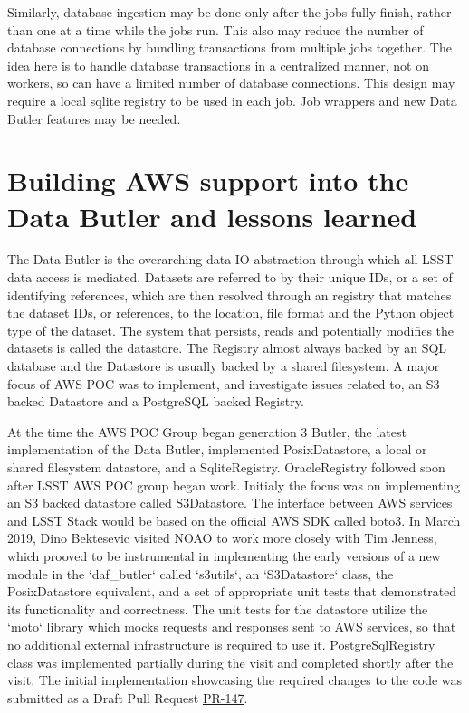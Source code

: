 Similarly, database ingestion may be done only after the jobs fully finish, rather than one at a time while the jobs run.
This also may reduce the number of database connections by bundling transactions from multiple jobs together.
The idea here is to handle database transactions in a centralized manner, not on workers, so can have a limited number of database connections.
This design may require a local sqlite registry to be used in each job.
Job wrappers and new Data Butler features may be needed.


\section{Building AWS support into the Data Butler and lessons learned}

The Data Butler is the overarching data IO abstraction through which all LSST data access is mediated. Datasets are referred to by their unique IDs, or a set of identifying references, which are then resolved through an registry that matches the dataset IDs, or references, to the location, file format and the Python object type of the dataset. The system that persists, reads and potentially modifies the datasets is called the datastore. The Registry almost always backed by an SQL database and the Datastore is usually backed by a shared filesystem. A major focus of AWS POC was to implement, and investigate issues related to, an S3 backed Datastore and a PostgreSQL backed Registry.

At the time the AWS POC Group began generation 3 Butler, the latest implementation of the Data Butler, implemented PosixDatastore, a local or shared filesystem datastore, and a SqliteRegistry. OracleRegistry followed soon after LSST AWS POC group began work. Initialy the focus was on implementing an S3 backed datastore called S3Datastore. The interface between AWS services and LSST Stack would be based on the official AWS SDK called boto3. In March 2019, Dino Bektesevic visited NOAO to work more closely with Tim Jenness, which prooved to be instrumental in implementing the early versions of a new module in the `daf\_butler` called `s3utils`, an `S3Datastore` class, the PosixDatastore equivalent, and a set of appropriate unit tests that demonstrated its functionality and correctness. The unit tests for the datastore utilize the `moto` library which mocks requests and responses sent to AWS services, so that no additional external infrastructure is required to use it. PostgreSqlRegistry class was implemented partially during the visit and completed shortly after the visit. The initial implementation showcasing the required changes to the code was submitted as a Draft Pull Request \href{https://github.com/lsst/daf_butler/pull/147}{PR-147}. 

